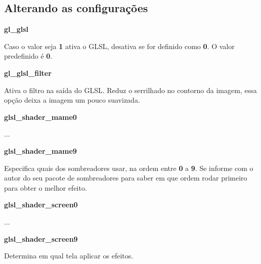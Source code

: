 \documentclass[letterpaper,10pt,brazil]{sphinxmanual}
\begin{document}
\subsection{Alterando as configurações}
\label{advanced/glsl:id2}
\begin{DUlineblock}{0em}
\item[] \textbf{gl\_glsl}
\item[] 
\item[]
\begin{DUlineblock}{\DUlineblockindent}
\item[] Caso o valor seja \textbf{1} ativa o GLSL, desativa se for definido como \textbf{0}. O valor predefinido é \textbf{0}.
\item[] 
\end{DUlineblock}
\item[] \textbf{gl\_glsl\_filter}
\item[] 
\item[]
\begin{DUlineblock}{\DUlineblockindent}
\item[] Ativa o filtro na saída do GLSL. Reduz o serrilhado no contorno da imagem,  essa opção deixa a imagem um pouco suavizada.
\item[] 
\end{DUlineblock}
\item[] \textbf{glsl\_shader\_mame0}
\item[]
\begin{DUlineblock}{\DUlineblockindent}
\item[] ...
\end{DUlineblock}
\item[] \textbf{glsl\_shader\_mame9}
\item[] 
\item[]
\begin{DUlineblock}{\DUlineblockindent}
\item[] Especifica quais dos sombreadores usar, na ordem entre \textbf{0} a \textbf{9}. Se informe com o autor do seu pacote de sombreadores para saber em que ordem rodar primeiro para obter o melhor efeito.
\item[] 
\end{DUlineblock}
\item[] \textbf{glsl\_shader\_screen0}
\item[]
\begin{DUlineblock}{\DUlineblockindent}
\item[] ...
\end{DUlineblock}
\item[] \textbf{glsl\_shader\_screen9}
\item[] 
\item[]
\begin{DUlineblock}{\DUlineblockindent}
\item[] Determina em qual tela aplicar os efeitos.
\item[] 
\end{DUlineblock}
\end{DUlineblock}
\end{document}
